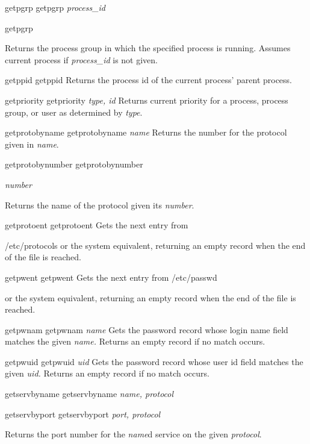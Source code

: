 \documentclass[a4paper,11pt]{book}
\begin{document}
\noindent getpgrp getpgrp \textit{process\_id}

\noindent getpgrp

\noindent 

\noindent Returns the process group in which the specified process is running. Assumes current process if \textit{process\_id }is not given.

\noindent getppid getppid Returns the process id of the current process' parent process.

\noindent getpriority getpriority \textit{type, id }Returns current priority for a process, process group, or user as determined by \textit{type}.

\noindent getprotobyname getprotobyname \textit{name }Returns the number for the protocol given in \textit{name}.

\noindent getprotobynumber getprotobynumber

\noindent \textit{number}

\noindent 

\noindent Returns the name of the protocol given its \textit{number}.

\noindent getprotoent getprotoent Gets the next entry from

\noindent /etc/protocols or the system equivalent, returning an empty record when the end of the file is reached.

\noindent getpwent getpwent Gets the next entry from /etc/passwd

\noindent or the system equivalent, returning an empty record when the end of the file is reached.

\noindent getpwnam getpwnam \textit{name }Gets the password record whose login name field matches the given \textit{name. }Returns an empty record if no match occurs.

\noindent 

\noindent getpwuid getpwuid \textit{uid }Gets the password record whose user id field matches the given \textit{uid. }Returns an empty record if no match occurs.

\noindent getservbyname getservbyname \textit{name, protocol}

\noindent 

\noindent getservbyport getservbyport \textit{port, protocol}

\noindent 

\noindent Returns the port number for the \textit{name}d service on the given \textit{protocol}.

\noindent 
\end{document}
